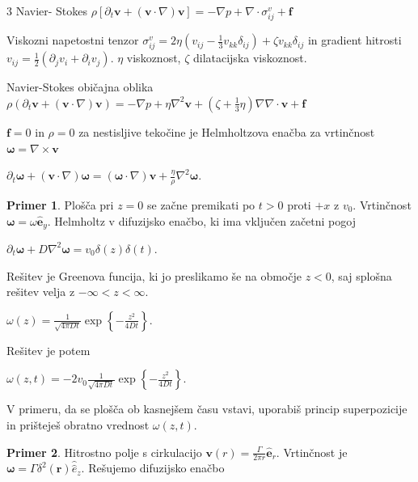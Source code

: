 \documentclass[10pt,landscape]{article}
\theoremstyle{definition}
\newtheorem*{primer}{Primer}
\begin{document}
\begin{multicols}{3}
  Navier- Stokes \( \rho \left[ \partial_t \mathbf{v} + \left( \mathbf{v} \cdot \nabla \right) \mathbf{v} \right] = - \nabla p + \nabla \cdot \sigma_{ij}^v + \mathbf{f} \)

  Viskozni napetostni tenzor \( \sigma_{ij}^{v} = 2 \eta \left( v_{ij} - \frac{1}{3} v_{kk} \delta_{ij} \right) + \zeta v_{kk} \delta_{ij} \) in gradient hitrosti \( v_{ij} = \frac{1}{2} \left( \partial_j v_i + \partial_i v_j \right) \). \( \eta \) viskoznost, \( \zeta \) dilatacijska viskoznost.

  Navier-Stokes običajna oblika \( \rho \left( \partial_t \mathbf{v} + \left( \mathbf{v} \cdot \nabla \right) \mathbf{v} \right) = - \nabla p + \eta \nabla ^2 \mathbf{v} + \left( \zeta + \frac{1}{3} \eta \right) \nabla \nabla \cdot \mathbf{v} + \mathbf{f} \)

  \( \mathbf{f} = 0 \) in \( \rho = 0 \) za nestisljive tekočine je Helmholtzova enačba za vrtinčnost \( \bm{\omega} = \nabla \times \mathbf{v} \)

  \( \partial_t \bm{\omega} + \left( \mathbf{v} \cdot \nabla \right) \bm{\omega} = \left( \bm{\omega} \cdot \nabla \right) \mathbf{v} + \frac{\eta}{\rho} \nabla ^2 \bm{\omega} \).

  \begin{primer}
    Plošča pri \( z = 0 \) se začne premikati po \( t > 0 \) proti \( + x \) z \( v_0 \). Vrtinčnost \( \bm{\omega} = \omega \hat{\mathbf{e}}_y \). Helmholtz v difuzijsko enačbo, ki ima vključen začetni pogoj

    \( \partial_t \bm{\omega} + D \nabla ^2 \bm{\omega} = v_0 \delta(z) \delta(t)  \).

    Rešitev je Greenova funcija, ki jo preslikamo še na območje \( z < 0 \), saj splošna rešitev velja z \( - \infty < z < \infty \).

    \( \omega(z) = \frac{1}{\sqrt{4 \pi D t}} \exp \left\{ - \frac{z ^2}{4 D t} \right\} \).

    Rešitev je potem

    \( \omega(z, t) = - 2 v_0 \frac{1}{\sqrt{4 \pi D t}} \exp \left\{ - \frac{z ^2}{4 D t} \right\} \).

    V primeru, da se plošča ob kasnejšem času vstavi, uporabiš princip superpozicije in prišteješ obratno vrednost \( \omega(z, t) \).
  \end{primer}

  \begin{primer}
    Hitrostno polje s cirkulacijo \( \mathbf{v}(r) = \frac{\Gamma}{2 \pi r} \hat{\mathbf{e}}_r \). Vrtinčnost je \( \bm{\omega} = \Gamma \delta ^2(\mathbf{r})  \hat{\hat{e}}_z \). Rešujemo difuzijsko enačbo


\end{primer}
\end{multicols}
\end{document}

